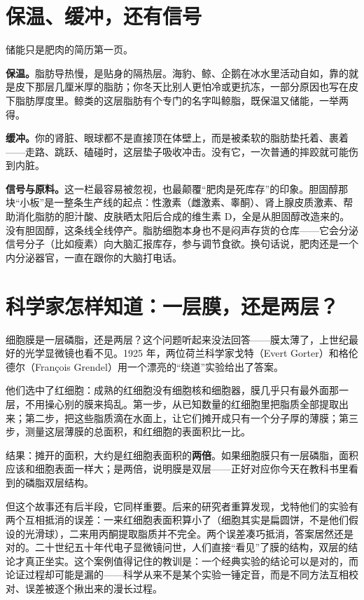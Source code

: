 \section{保温、缓冲，还有信号}

储能只是肥肉的简历第一页。

\textbf{保温。}脂肪导热慢，是贴身的隔热层。海豹、鲸、企鹅在冰水里活动自如，靠的就是皮下那层几厘米厚的脂肪；你冬天比别人更怕冷或更抗冻，一部分原因也写在皮下脂肪厚度里。鲸类的这层脂肪有个专门的名字叫鲸脂，既保温又储能，一举两得。

\textbf{缓冲。}你的肾脏、眼球都不是直接顶在体壁上，而是被柔软的脂肪垫托着、裹着——走路、跳跃、磕碰时，这层垫子吸收冲击。没有它，一次普通的摔跤就可能伤到内脏。

\textbf{信号与原料。}这一栏最容易被忽视，也最颠覆“肥肉是死库存”的印象。胆固醇那块“小板”是一整条生产线的起点：性激素（雌激素、睾酮）、肾上腺皮质激素、帮助消化脂肪的胆汁酸、皮肤晒太阳后合成的维生素 D，全是从胆固醇改造来的。没有胆固醇，这条线全线停产。脂肪细胞本身也不是闷声存货的仓库——它会分泌信号分子（比如瘦素）向大脑汇报库存，参与调节食欲。换句话说，肥肉还是一个内分泌器官，一直在跟你的大脑打电话。

\section{科学家怎样知道：一层膜，还是两层？}

\begin{zhengju}
细胞膜是一层磷脂，还是两层？这个问题听起来没法回答——膜太薄了，上世纪最好的光学显微镜也看不见。1925 年，两位荷兰科学家戈特（Evert Gorter）和格伦德尔（François Grendel）用一个漂亮的“绕道”实验给出了答案。

他们选中了红细胞：成熟的红细胞没有细胞核和细胞器，膜几乎只有最外面那一层，不用操心别的膜来捣乱。第一步，从已知数量的红细胞里把脂质全部提取出来；第二步，把这些脂质滴在水面上，让它们摊开成只有一个分子厚的薄膜；第三步，测量这层薄膜的总面积，和红细胞的表面积比一比。

结果：摊开的面积，大约是红细胞表面积的\textbf{两倍}。如果细胞膜只有一层磷脂，面积应该和细胞表面一样大；是两倍，说明膜是双层——正好对应你今天在教科书里看到的磷脂双层结构。

但这个故事还有后半段，它同样重要。后来的研究者重算发现，戈特他们的实验有两个互相抵消的误差：一来红细胞表面积算小了（细胞其实是扁圆饼，不是他们假设的光滑球），二来用丙酮提取脂质并不完全。两个误差凑巧抵消，答案居然还是对的。二十世纪五十年代电子显微镜问世，人们直接“看见”了膜的结构，双层的结论才真正坐实。这个案例值得记住的教训是：一个经典实验的结论可以是对的，而论证过程却可能是漏的——科学从来不是某个实验一锤定音，而是不同方法互相校对、误差被逐个揪出来的漫长过程。
\end{zhengju}


